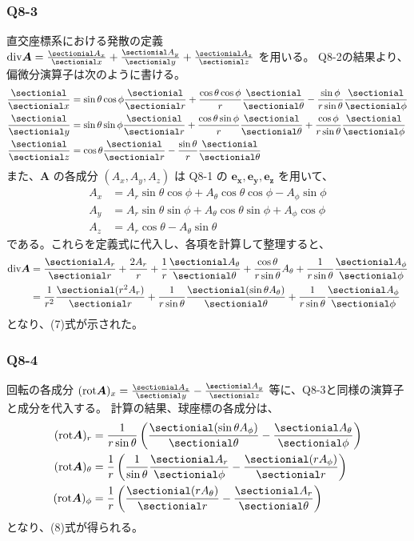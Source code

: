 \documentclass[platex,dvipdfmx,a4paper]{jsarticle}
\newcommand{\hb}[2]{\frac{\sectionial #1}{\sectionial #2}}
\newcommand{\vect}[1]{\boldsymbol{#1}}
\begin{document}
  \subsubsection*{Q8-3}
  直交座標系における発散の定義 $\text{div} \vect{A} = \hb{A_x}{x} + \hb{A_y}{y} + \hb{A_z}{z}$ を用いる。
  Q8-2の結果より、偏微分演算子は次のように書ける。
  \begin{align*}
    \hb{}{x} &= \sin{\theta}\cos{\phi}\hb{}{r} + \frac{\cos{\theta}\cos{\phi}}{r}\hb{}{\theta} - \frac{\sin{\phi}}{r\sin{\theta}}\hb{}{\phi} \\
    \hb{}{y} &= \sin{\theta}\sin{\phi}\hb{}{r} + \frac{\cos{\theta}\sin{\phi}}{r}\hb{}{\theta} + \frac{\cos{\phi}}{r\sin{\theta}}\hb{}{\phi} \\
    \hb{}{z} &= \cos{\theta}\hb{}{r} - \frac{\sin{\theta}}{r}\hb{}{\theta}
  \end{align*}
  また、$\vect{A}$ の各成分 $(A_x, A_y, A_z)$ は Q8-1 の $\vect{e_x}, \vect{e_y}, \vect{e_z}$ を用いて、
  \begin{align*}
    A_x &= A_r \sin{\theta}\cos{\phi} + A_\theta \cos{\theta}\cos{\phi} - A_\phi \sin{\phi} \\
    A_y &= A_r \sin{\theta}\sin{\phi} + A_\theta \cos{\theta}\sin{\phi} + A_\phi \cos{\phi} \\
    A_z &= A_r \cos{\theta} - A_\theta \sin{\theta}
  \end{align*}
  である。これらを定義式に代入し、各項を計算して整理すると、
  \begin{align*}
    \text{div} \vect{A} &= \hb{A_r}{r} + \frac{2A_r}{r} + \frac{1}{r}\hb{A_\theta}{\theta} + \frac{\cos{\theta}}{r\sin{\theta}}A_\theta + \frac{1}{r\sin{\theta}}\hb{A_\phi}{\phi} \\
    &= \frac{1}{r^2}\hb{(r^2 A_r)}{r} + \frac{1}{r\sin{\theta}}\hb{(\sin{\theta} A_\theta)}{\theta} + \frac{1}{r\sin{\theta}}\hb{A_\phi}{\phi}
  \end{align*}
  となり、(7)式が示された。

  \subsubsection*{Q8-4}
  回転の各成分 $(\text{rot} \vect{A})_x = \hb{A_z}{y} - \hb{A_y}{z}$ 等に、Q8-3と同様の演算子と成分を代入する。
  計算の結果、球座標の各成分は、
  \begin{align*}
    (\text{rot} \vect{A})_r &= \frac{1}{r\sin{\theta}} \left( \hb{(\sin{\theta} A_\phi)}{\theta} - \hb{A_\theta}{\phi} \right) \\
    (\text{rot} \vect{A})_\theta &= \frac{1}{r} \left( \frac{1}{\sin{\theta}}\hb{A_r}{\phi} - \hb{(r A_\phi)}{r} \right) \\
    (\text{rot} \vect{A})_\phi &= \frac{1}{r} \left( \hb{(r A_\theta)}{r} - \hb{A_r}{\theta} \right)
  \end{align*}
  となり、(8)式が得られる。
\end{document}

